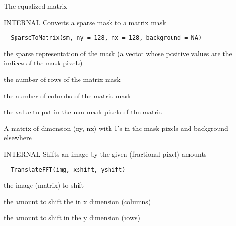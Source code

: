 \documentclass[a4paper]{book}
\begin{document}
%
\begin{Value}
The equalized matrix
\end{Value}
%
\begin{Description}\relax
INTERNAL Converts a sparse mask to a matrix mask
\end{Description}
%
\begin{Usage}
\begin{verbatim}
  SparseToMatrix(sm, ny = 128, nx = 128, background = NA)
\end{verbatim}
\end{Usage}
%
\begin{Arguments}
\begin{ldescription}
\item[\code{sm}] the sparse representation of the mask (a vector
whose positive values are the indices of the mask
pixels)

\item[\code{ny}] the number of rows of the matrix mask

\item[\code{nx}] the number of columbs of the matrix mask

\item[\code{background}] the value to put in the non-mask pixels
of the matrix
\end{ldescription}
\end{Arguments}
%
\begin{Value}
A matrix of dimension (ny, nx) with 1's in the mask
pixels and background elsewhere
\end{Value}
%
\begin{Description}\relax
INTERNAL Shifts an image by the given (fractional pixel)
amounts
\end{Description}
%
\begin{Usage}
\begin{verbatim}
  TranslateFFT(img, xshift, yshift)
\end{verbatim}
\end{Usage}
%
\begin{Arguments}
\begin{ldescription}
\item[\code{img}] the image (matrix) to shift

\item[\code{xshift}] the amount to shift the in x dimension
(columns)

\item[\code{yshift}] the amount to shift in the y dimension
(rows)
\end{ldescription}
\end{Arguments}
\end{document}
